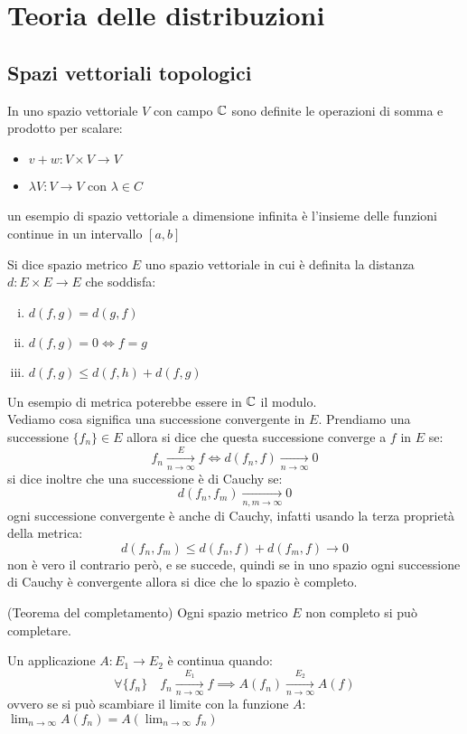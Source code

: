 \chapter{Teoria delle distribuzioni}
\section{Spazi vettoriali topologici}
In uno spazio vettoriale $V$ con campo $\mathbb{C}$ sono definite le operazioni di somma e prodotto per scalare:
\begin{itemize}
\item $v+w:V\times V\to V$
\item $\lambda V:V\to V$ con $\lambda\in C$ 
\end{itemize}
un esempio di spazio vettoriale a dimensione infinita è l'insieme delle funzioni continue in un intervallo $[a,b]$
\begin{dfn}
Si dice spazio metrico $E$ uno spazio vettoriale in cui è definita la distanza $d:E\times E\to E$ che soddisfa:
\begin{enumerate}[i.]
\item $d(f,g) = d(g,f)$
\item $d(f,g) = 0 \iff f=g$
\item $d(f,g)\leq d(f,h) + d(f,g)$
\end{enumerate}
\end{dfn}
Un esempio di metrica poterebbe essere in $\mathbb{C}$ il modulo.\\ Vediamo cosa significa una successione convergente in $E$.
Prendiamo una successione $\{f_n\}\in E$ allora si dice che questa successione converge a $f$ in $E$ se:
\[f_n \xrightarrow[n\to \infty]{E} f \iff d(f_n,f) \xrightarrow[n\to \infty]{}0 \]
si dice inoltre che una successione è di Cauchy se:
\[d(f_n,f_m) \xrightarrow[n,m\to \infty]{}0 \]
ogni successione convergente è anche di Cauchy, infatti usando la terza proprietà della metrica:
\[d(f_n,f_m) \leq d(f_n,f)+d(f_m,f)\to 0\]
non è vero il contrario però, e se succede, quindi se in uno spazio ogni successione di Cauchy è convergente allora si dice che lo spazio è completo.
\begin{thm}
(Teorema del completamento) Ogni spazio metrico $E$ non completo si può completare.
\end{thm}
\hspace{-1.4em}Un applicazione $A:E_1\to E_2$ è continua quando:
\[\forall \{f_n\}\quad f_n \xrightarrow[n\to \infty]{E_1} f \implies A(f_n) \xrightarrow[n\to \infty]{E_2} A(f) \]
ovvero se si può scambiare il limite con la funzione $A$: $\displaystyle\lim_{n\to\infty}A(f_n) = A(\displaystyle\lim_{n\to\infty} f_n)$
